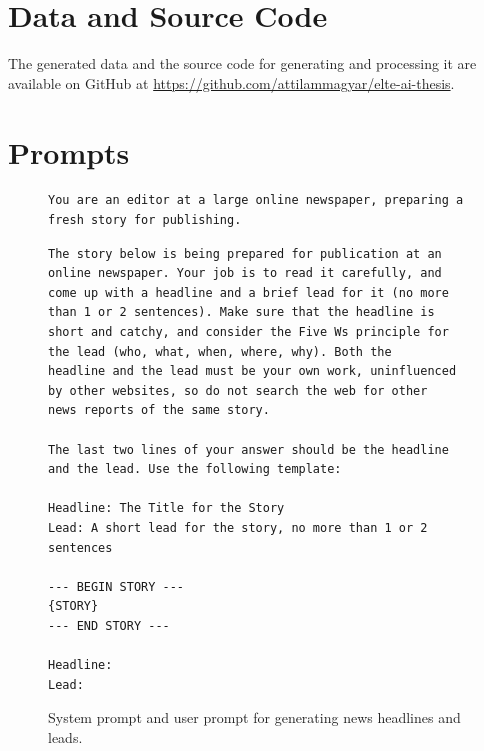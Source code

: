 \documentclass[UTF8,noindent,nohyp,parspace,titlepage,twoside,12pt]{article}
\begin{document}
\clearpage

  \appendix

  \section{Data and Source Code}

    The generated data and the source code for generating and processing it
    are available on GitHub at \url{https://github.com/attilammagyar/elte-ai-thesis}.

\clearpage

  \section{Prompts}

    \begin{figure}[hbtp]
      \begin{lstlisting}[basicstyle=\tiny\sffamily,frame=single,linewidth=\textwidth]
You are an editor at a large online newspaper, preparing a fresh story for publishing.
      \end{lstlisting}
      \begin{lstlisting}[basicstyle=\tiny\sffamily,frame=single,linewidth=\textwidth]
The story below is being prepared for publication at an online newspaper. Your job is to read it carefully, and
come up with a headline and a brief lead for it (no more than 1 or 2 sentences). Make sure that the headline is
short and catchy, and consider the Five Ws principle for the lead (who, what, when, where, why). Both the
headline and the lead must be your own work, uninfluenced by other websites, so do not search the web for other
news reports of the same story.

The last two lines of your answer should be the headline and the lead. Use the following template:

Headline: The Title for the Story
Lead: A short lead for the story, no more than 1 or 2 sentences

--- BEGIN STORY ---
{STORY}
--- END STORY ---

Headline:
Lead:
      \end{lstlisting}
      \caption{%
        System prompt and user prompt for generating news headlines and leads.
      }
      \label{figgennews}
    \end{figure}
\end{document}
